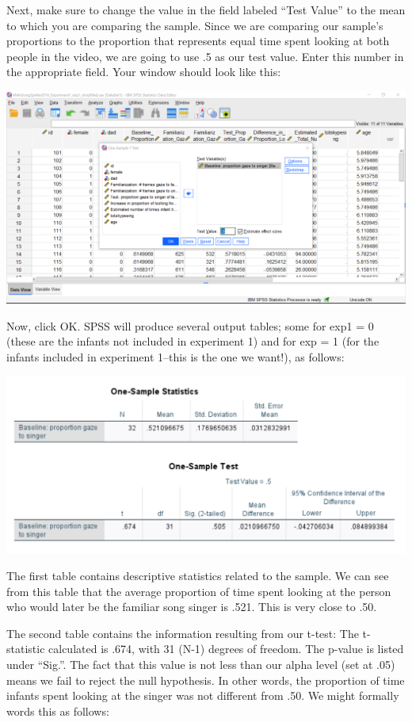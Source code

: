 \documentclass[]{book}
\begin{document}
Next, make sure to change the value in the field labeled ``Test Value''
to the mean to which you are comparing the sample. Since we are
comparing our sample's proportions to the proportion that represents
equal time spent looking at both people in the video, we are going to
use .5 as our test value. Enter this number in the appropriate field.
Your window should look like this:

\includegraphics{img/6.4.15.png}

Now, click {OK}. SPSS will produce several output tables; some for exp1
= 0 (these are the infants not included in experiment 1) and for exp = 1
(for the infants included in experiment 1--this is the one we want!), as
follows:

\includegraphics{img/6.4.16.png}

The first table contains descriptive statistics related to the sample.
We can see from this table that the average proportion of time spent
looking at the person who would later be the familiar song singer is
.521. This is very close to .50.

The second table contains the information resulting from our t-test: The
t-statistic calculated is .674, with 31 (N-1) degrees of freedom. The
p-value is listed under ``Sig.''. The fact that this value is not less
than our alpha level (set at .05) means we fail to reject the null
hypothesis. In other words, the proportion of time infants spent looking
at the singer was not different from .50. We might formally words this
as follows:
\end{document}

